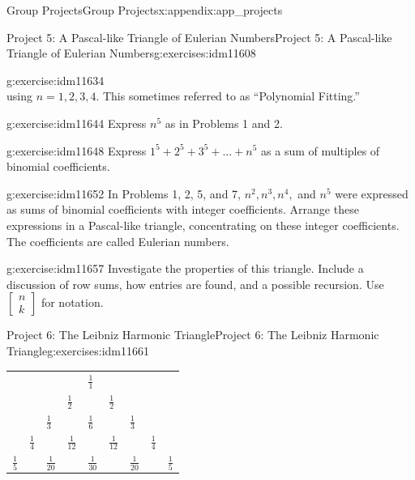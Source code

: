 \documentclass[oneside,10pt,]{book}
\numberwithin{equation}{chapter}
\begin{document}
\begin{appendixptx}{Group Projects}{}{Group Projects}{}{}{x:appendix:app_projects}
\begin{exercises-section-numberless}{Project 5: A Pascal-like Triangle of Eulerian Numbers}{}{Project 5: A Pascal-like Triangle of Eulerian Numbers}{}{}{g:exercises:idm11608}
\begin{divisionexercise}{7}{}{}{g:exercise:idm11634}
\begin{equation*}
\end{equation*}
using \(n=1, 2, 3, 4\). This sometimes referred to as ``Polynomial Fitting.''%
\end{divisionexercise}%
\begin{divisionexercise}{8}{}{}{g:exercise:idm11644}%
Express \(n^{5}\) as in Problems 1 and 2.%
\end{divisionexercise}%
\begin{divisionexercise}{9}{}{}{g:exercise:idm11648}%
Express \(1^{5} + 2^{5} + 3^{5} + \ldots + n^{5}\) as a sum of multiples of binomial coefficients.%
\end{divisionexercise}%
\begin{divisionexercise}{10}{}{}{g:exercise:idm11652}%
In Problems 1, 2, 5, and 7, \(n^{2},n^{3},n^{4},\) and \(n^{5}\) were expressed as sums of binomial coefficients with integer coefficients. Arrange these expressions in a Pascal-like triangle, concentrating on these integer coefficients. The coefficients are called Eulerian numbers.%
\end{divisionexercise}%
\begin{divisionexercise}{11}{}{}{g:exercise:idm11657}%
Investigate the properties of this triangle. Include a discussion of row sums, how entries are found, and a possible recursion. Use \(\begin{bmatrix}
n\\
k
\end{bmatrix}\) for notation.%
\end{divisionexercise}%
\end{exercises-section-numberless}
%
%
\typeout{************************************************}
\typeout{************************************************}
%
\begin{exercises-section-numberless}{Project 6: The Leibniz Harmonic Triangle}{}{Project 6: The Leibniz Harmonic Triangle}{}{}{g:exercises:idm11661}
\begin{sidebyside}{1}{0}{0}{0}%
\begin{sbspanel}{1}%
{\centering%
\begin{tabular}{lllllllll}
&&&&\(\frac{1}{1}\)&&&&\tabularnewline[0pt]
&&&\(\frac{1}{2}\)&&\(\frac{1}{2}\)&&&\tabularnewline[0pt]
&&\(\frac{1}{3}\)&&\(\frac{1}{6}\)&&\(\frac{1}{3}\)&&\tabularnewline[0pt]
&\(\frac{1}{4}\)&&\(\frac{1}{12}\)&&\(\frac{1}{12}\)&&\(\frac{1}{4}\)&\tabularnewline[0pt]
\(\frac{1}{5}\)&&\(\frac{1}{20}\)&&\(\frac{1}{30}\)&&\(\frac{1}{20}\)&&\(\frac{1}{5}\)
\end{tabular}
}
\end{sbspanel}
\end{sidebyside}
\end{exercises-section-numberless}
\end{appendixptx}
\end{document}

